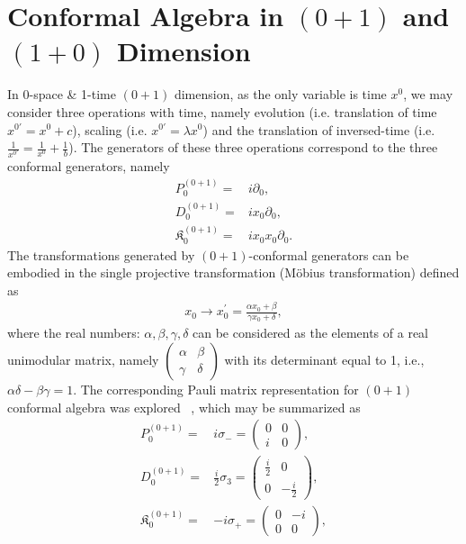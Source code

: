 \documentclass[%
 reprint,
superscriptaddress,
 amsmath,amssymb,
 aps,
]{revtex4-2}
\begin{document}
\section{Conformal Algebra in \texorpdfstring{$(0+1)$}
{Lg} and \texorpdfstring{$(1+0)$}{Lg} Dimension}
\label{sec:conformal0110}
 In 0-space \& 1-time $(0+1)$ dimension, as the only variable is time $x^0$, we may consider three operations with time, namely evolution (i.e. translation of time $x^{0\prime}=x^0+c$), scaling (i.e. $x^{0\prime} = \lambda x^0$) and the translation of inversed-time (i.e. $\frac{1}{x^{0\prime}}=\frac{1}{x^0}+\frac{1}{b}$). The generators of these three operations correspond to the three conformal generators, namely
\begin{align}
    P^{(0+1)}_{0}=&i\partial_{0},\label{P01}\\
    D^{(0+1)}_{0}=&ix_{0}\partial_{0},\label{D01}\\
    \mathfrak{K}^{(0+1)}_{{0}}=&ix_{0}x_{0}\partial_{{0}}.\label{KK01}
\end{align}
The transformations generated by $(0+1)$-conformal generators can be embodied in the single projective transformation (Möbius transformation) defined as
\begin{align}
    x_{0}\rightarrow x^{\prime}_{0}=\frac{\alpha x_{0} +\beta}{\gamma x_{0} +\delta},
\end{align}
where the real numbers: $\alpha, \beta, \gamma, \delta$ can be considered as the elements of a real unimodular matrix, namely $\begin{pmatrix}
    \alpha &  \beta \\
   \gamma & \delta
\end{pmatrix}$ with its determinant equal to 1, i.e., $\alpha\delta-\beta\gamma=1$. The corresponding Pauli matrix representation for $(0+1)$ conformal algebra was explored~ \cite{Fubini1976}, which may be summarized as 
\begin{align}
    P^{(0+1)}_{0}=&i\sigma_{-}=\begin{pmatrix}
        0&0\\
        i&0
    \end{pmatrix},\label{P01Pauli}\\
    D^{(0+1)}_{0}=&\frac{i}{2}\sigma_{3}=\begin{pmatrix}
        \frac{i}{2}&0\\
        0&-\frac{i}{2}
    \end{pmatrix},\label{D01Pauli}\\
    \mathfrak{K}^{(0+1)}_{{0}}=&-i\sigma_{+}=\begin{pmatrix}
        0&-i\\
        0&0
    \end{pmatrix},\label{KK01Pauli}
\end{align}
\end{document}
